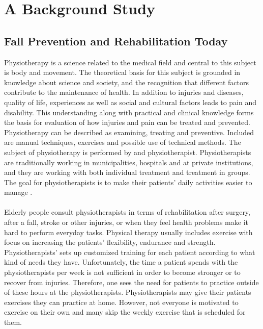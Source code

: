 \chapter{A Background Study}

\section{Fall Prevention and Rehabilitation Today}
Physiotherapy is a science related to the medical field and central to this subject is body and movement. The theoretical basis for this subject is grounded in knowledge about science and society, and the recognition that different factors contribute to the maintenance of health. In addition to injuries and diseases, quality of life, experiences as well as social and cultural factors leads to pain and disability. This understanding along with practical and clinical knowledge forms the basis for evaluation of how injuries and pain can be treated and prevented. Physiotherapy can be described as examining, treating and preventive. Included are manual techniques, exercises and possible use of technical methods. The subject of physiotherapy is performed by and physiotherapist. Physiotherapists are traditionally working in municipalities, hospitals and at private institutions, and they are working with both individual treatment and treatment in groups. The goal for physiotherapists is to make their patients’ daily activities easier to manage \cite{physiotherapy1}\cite{physiotherapy2}.\\ \\
Elderly people consult physiotherapists in terms of rehabilitation after surgery, after a fall, stroke or other injuries, or when they feel health problems make it hard to perform everyday tasks. Physical therapy usually includes exercise with focus on increasing the patients’ flexibility, endurance and strength. Physiotherapists’ sets up customized training for each patient according to what kind of needs they have. Unfortunately, the time a patient spends with the physiotherapists per week is not sufficient in order to become stronger or to recover from injuries. Therefore, one sees the need for patients to practice outside of these hours at the physiotherapists. Physiotherapists may give their patients exercises they can practice at home. However, not everyone is motivated to exercise on their own and many skip the weekly exercise that is scheduled for them. \cite{physiotherapy2} 

